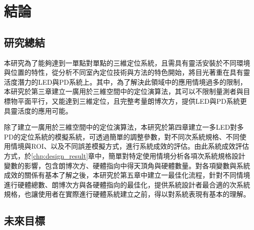 \chapter{結論}
\label{chp:6}


\section{研究總結}

本研究為了能夠達到一單點對單點的三維定位系統，且需具有靈活安裝於不同環境與位置的特性，從分析不同室內定位技術與方法的特色開始，將目光著重在具有靈活度潛力的LED與PD系統上。其中，為了解決此領域中的應用情境過多的限制，本研究於第三章建立一廣用於三維空間中的定位演算法，其可以不限制量測者與目標物平面平行，又能達到三維定位，且完整考量朗博次方，提供LED與PD系統更具靈活度的應用可能。

除了建立一廣用於三維空間中的定位演算法，本研究於第四章建立一多LED對多PD的定位系統的模擬系統，可透過簡單的調整參數，對不同次系統規格、不同使用情境與ROI、以及不同誤差模擬方式，進行系統成效的評估。由此系統成效評估方式，於\ref{chp:design_result}章中，簡單對特定使用情境分析各項次系統規格設計變數的影響，包含朗博次方、硬體指向中得天頂角與硬體數量。對各項變數與系統成效的關係有基本了解之後，本研究於第五章中建立一最佳化流程，針對不同情境進行硬體總數、朗博次方與各硬體指向的最佳化，提供系統設計者最合適的次系統規格，也讓使用者在實際進行硬體系統建立之前，得以對系統表現有基本的理解。



\section{未來目標}


